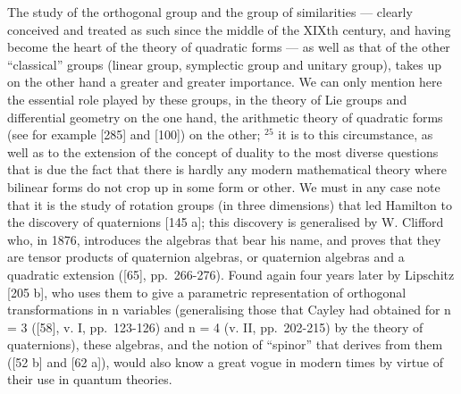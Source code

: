 The study of the orthogonal group and the group of similarities --- clearly conceived and treated as such since the middle of the XIXth century, and having become the heart of the theory of quadratic forms --- as well as that of the other ``classical'' groups (linear group, symplectic group and unitary group), takes up on the other hand a greater and greater importance. We can only mention here the essential role played by these groups, in the theory of Lie groups and differential geometry on the one hand, the arithmetic theory of quadratic forms (see for example {[}285{]} and {[}100{]}) on the other; \(^{25}\) it is to this circumstance, as well as to the extension of the concept of duality to the most diverse questions that is due the fact that there is hardly any modern mathematical theory where bilinear forms do not crop up in some form or other. We must in any case note that it is the study of rotation groups (in three dimensions) that led Hamilton to the discovery of quaternions {[}145 a{]}; this discovery is generalised by W. Clifford who, in 1876, introduces the algebras that bear his name, and proves that they are tensor products of quaternion algebras, or quaternion algebras and a quadratic extension ({[}65{]}, pp.~266-276). Found again four years later by Lipschitz {[}205 b{]}, who uses them to give a parametric representation of orthogonal transformations in n variables (generalising those that Cayley had obtained for n = 3 ({[}58{]}, v. I, pp.~123-126) and n = 4 (v. II, pp.~202-215) by the theory of quaternions), these algebras, and the notion of ``spinor'' that derives from them ({[}52 b{]} and {[}62 a{]}), would also know a great vogue in modern times by virtue of their use in quantum theories.

